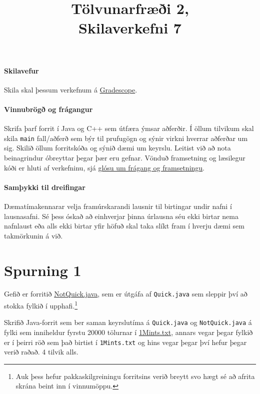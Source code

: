 \documentclass{article}
\title{Tölvunarfræði 2, \semester \\ Skilaverkefni 7}
\author{}
\begin{document}
\maketitle
{}

\paragraph{Skilavefur} Skila skal þessum verkefnum á \href{https://gradescope.com/courses/5640}{Gradescope}.

\paragraph{Vinnubrögð og frágangur} Skrifa þarf forrit í Java og C++ sem útfæra ýmsar aðferðir. Í öllum tilvikum skal skila \texttt{main} fall/aðferð sem býr til prufugögn og sýnir virkni hverrar aðferðar um sig. Skilið öllum forritskóða og sýnið dæmi um keyrslu. Leitist við að nota beinagrindur óbreyttar þegar þær eru gefnar. Vönduð framsetning og læsilegur kóði er hluti af verkefninu, sjá \href{https://piazza.com/class/ixkicfen49l111?cid=52}{glósu um frágang og framsetningu}.

\paragraph{Samþykki til dreifingar} Dæmatímakennarar velja framúrskarandi lausnir til birtingar undir nafni í lausnasafni. Sé þess óskað að einhverjar þinna úrlausna séu ekki birtar nema nafnlaust eða alls ekki birtar yfir höfuð skal taka slíkt fram í hverju dæmi sem takmörkunin á við.

\section{Spurning 1}
Gefið er forritið \href{https://github.com/Ernir/kennsluefni/tree/master/T2/Code/w7/NotQuick.java}{NotQuick.java}, sem er útgáfa af \texttt{Quick.java} sem sleppir því að stokka fylkið í upphafi.\footnote{Auk þess hefur pakkaskilgreiningu forritsins verið breytt svo hægt sé að afrita skrána beint inn í vinnumöppu.}

Skrifið Java-forrit sem ber saman keyrslutíma á \texttt{Quick.java} og \texttt{NotQuick.java} á fylki sem inniheldur fyrstu 20000 tölurnar í \href{http://algs4.cs.princeton.edu/14analysis/1Mints.txt}{1Mints.txt}, annars vegar þegar fylkið er í þeirri röð sem það birtist í \texttt{1Mints.txt} og hins vegar þegar því hefur þegar verið raðað. 4 tilvik alls.
\end{document}
